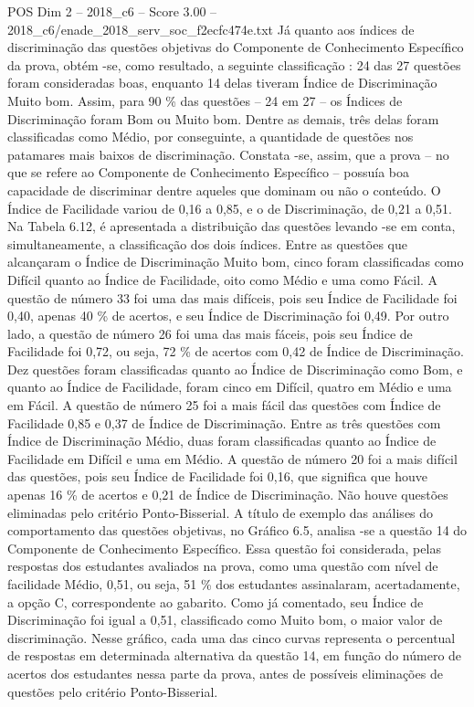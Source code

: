 \begin{textsample}{POS Dim 2 – 2018\_c6 – Score 3.00 – 2018\_c6/enade\_2018\_serv\_soc\_f2ecfc474e.txt}
Já quanto aos índices de discriminação das questões objetivas do Componente de Conhecimento Específico da prova, obtém -se, como resultado, a seguinte classificação : 24 das 27 questões foram consideradas boas, enquanto 14 delas tiveram Índice de Discriminação Muito bom.
Assim, para 90 \% das questões – 24 em 27 – os Índices de Discriminação foram Bom ou Muito bom.
Dentre as demais, três delas foram classificadas como Médio, por conseguinte, a quantidade de questões nos patamares mais baixos de discriminação.
Constata -se, assim, que a prova – no que se refere ao Componente de Conhecimento Específico – possuía boa capacidade de discriminar dentre aqueles que dominam ou não o conteúdo.
O Índice de Facilidade variou de 0,16 a 0,85, e o de Discriminação, de 0,21 a 0,51.
Na Tabela 6.12, é apresentada a distribuição das questões levando -se em conta, simultaneamente, a classificação dos dois índices.
Entre as questões que alcançaram o Índice de Discriminação Muito bom, cinco foram classificadas como Difícil quanto ao Índice de Facilidade, oito como Médio e uma como Fácil.
A questão de número 33 foi uma das mais difíceis, pois seu Índice de Facilidade foi 0,40, apenas 40 \% de acertos, e seu Índice de Discriminação foi 0,49.
Por outro lado, a questão de número 26 foi uma das mais fáceis, pois seu Índice de Facilidade foi 0,72, ou seja, 72 \% de acertos com 0,42 de Índice de Discriminação.
Dez questões foram classificadas quanto ao Índice de Discriminação como Bom, e quanto ao Índice de Facilidade, foram cinco em Difícil, quatro em Médio e uma em Fácil.
A questão de número 25 foi a mais fácil das questões com Índice de Facilidade 0,85 e 0,37 de Índice de Discriminação.
Entre as três questões com Índice de Discriminação Médio, duas foram classificadas quanto ao Índice de Facilidade em Difícil e uma em Médio.
A questão de número 20 foi a mais difícil das questões, pois seu Índice de Facilidade foi 0,16, que significa que houve apenas 16 \% de acertos e 0,21 de Índice de Discriminação.
Não houve questões eliminadas pelo critério Ponto-Bisserial.
A título de exemplo das análises do comportamento das questões objetivas, no Gráfico 6.5, analisa -se a questão 14 do Componente de Conhecimento Específico.
Essa questão foi considerada, pelas respostas dos estudantes avaliados na prova, como uma questão com nível de facilidade Médio, 0,51, ou seja, 51 \% dos estudantes assinalaram, acertadamente, a opção C, correspondente ao gabarito.
Como já comentado, seu Índice de Discriminação foi igual a 0,51, classificado como Muito bom, o maior valor de discriminação.
Nesse gráfico, cada uma das cinco curvas representa o percentual de respostas em determinada alternativa da questão 14, em função do número de acertos dos estudantes nessa parte da prova, antes de possíveis eliminações de questões pelo critério Ponto-Bisserial.

\end{textsample}
